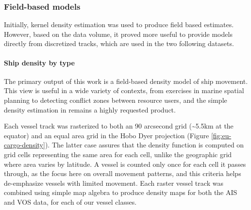 \documentclass[12pt,letterpaper]{article}
\begin{document}

\subsubsection{Field-based models}

Initially, kernel density estimation was used to produce field based estimates. However, based on the data volume, it proved more useful to provide models directly from discretized tracks, which are used in the two following datasets.

\paragraph{Ship density by type}

The primary output of this work is a field-based density model of ship movement. This view is useful in a wide variety of contexts, from exercises in marine spatial planning to detecting conflict zones between resource users, and the simple density estimation in \cite{Halpern2008} remains a highly requested product. %

Each vessel track was rasterized to both an 90 arcsecond grid (\textasciitilde{}5.5km at the equator) and an equal area grid in the Hobo Dyer projection (Figure \ref{fig:eu-cargo-density}). The latter case assures that the density function is computed on grid cells representing the same area for each cell, unlike the geographic grid where area varies by latitude. A vessel is counted only once for each cell it passes through, as the focus here on overall movement patterns, and this criteria helps de-emphasize vessels with limited movement. Each raster vessel track was combined using simple map algebra to produce density maps for both the AIS and VOS data, for each of our vessel classes. %
\end{document}
